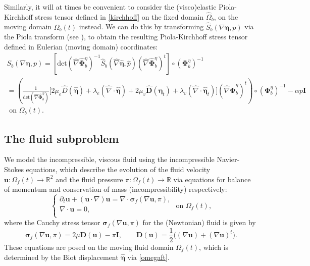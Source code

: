 \documentclass[11pt]{article}
\newcommand{\bd}{\boldsymbol}
\def\R{{\mathbb R}}
\theoremstyle{definition}
\begin{document}
Similarly, it will at times be convenient to consider the (visco)elastic Piola-Kirchhoff stress tensor defined in \eqref{kirchhoff} on the fixed domain $\hat{\Omega}_{b}$, on the moving domain $\Omega_{b}(t)$ instead. We can do this by transforming $\hat{S}_{b}(\nabla \bd{\eta}, p)$ via the Piola transform (see \cite{Ciarlet}), to obtain the resulting Piola-Kirchhoff stress tensor defined in Eulerian (moving domain) coordinates:
\begin{multline}\label{kirchlagrangian}
S_{b}(\nabla \bd{\eta}, p) = [\text{det}(\hat{\nabla} \hat{\bd{\Phi}}^{\eta}_{b})^{-1} \hat{S}_{b}(\hat{\nabla} \hat{\bd{\eta}}, \hat{p}) (\hat{\nabla} \hat{\bd{\Phi}}^{\eta}_{b})^{t}] \circ (\bd{\Phi}^{\eta}_{b})^{-1} \\
= \left(\frac{1}{\text{det}(\hat{\nabla}\hat{\bd{\Phi}}^{\eta}_{b})} \Big[2\mu_{e} \hat{D}(\hat{\bd{\eta}}) + \lambda_{e}(\hat{\nabla} \cdot \hat{\bd{\eta}}) + 2\mu_{v} \hat{\bd{D}}(\hat{\bd{\eta}}_{t}) + \lambda_{v} (\hat{\nabla} \cdot \hat{\bd{\eta}}_{t})\Big] (\hat{\nabla} \hat{\bd{\Phi}}^{\eta}_{b})^{t}\right) \circ (\bd{\Phi}^{\eta}_{b})^{-1} - \alpha p \bd{I} \\
\text{ on } \Omega_{b}(t).
\end{multline}

\subsection{The fluid subproblem}

We model the incompressible, viscous fluid using the incompressible Navier-Stokes equations, which describe the evolution of the fluid velocity $\bd{u}: \Omega_{f}(t) \to \R^{2}$ and the fluid pressure $\pi: \Omega_{f}(t) \to \R$ via equations for balance of momentum and conservation of mass (incompressibility) respectively:
\begin{equation}\label{NS}
\begin{cases}
\partial_{t} \bd{u} + (\bd{u} \cdot \nabla) \bd{u} = \nabla \cdot \bd{\sigma}_{f}(\nabla \bd{u}, \pi), \\
\nabla \cdot \bd{u} = 0, \\
\end{cases}
\text{ on } \Omega_{f}(t),
\end{equation}
where the Cauchy stress tensor $\bd{\sigma}_{f}(\nabla \bd{u}, \pi)$ for the (Newtonian) fluid is given by
\begin{equation*}
\bd{\sigma}_{f}(\nabla \bd{u}, \pi) = 2\mu \bd{D}(\bd{u}) - \pi \bd{I}, \qquad \bd{D}(\bd{u}) = \frac{1}{2}\Big((\nabla \bd{u}) + (\nabla \bd{u})^{t}\Big).
\end{equation*}
These equations are posed on the moving fluid domain $\Omega_{f}(t)$, which is determined by the Biot displacement $\hat{\bd{\eta}}$ via \eqref{omegaft}. 
\end{document}

